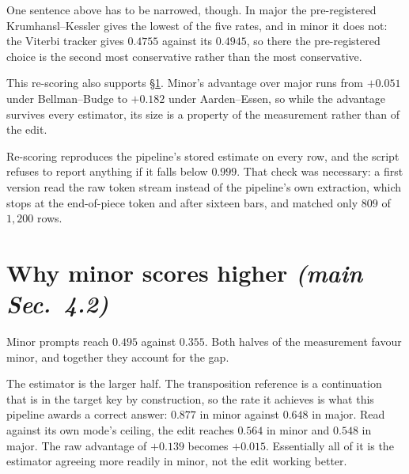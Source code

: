 \documentclass{article}
\begin{document}
One sentence above has to be narrowed, though. In major the pre-registered
Krumhansl--Kessler gives the lowest of the five rates, and in minor it does not: the
Viterbi tracker gives $0.4755$ against its $0.4945$, so there the pre-registered choice
is the second most conservative rather than the most conservative.

This re-scoring also supports \S\ref{sec:minor}. Minor's advantage over major runs from
$+0.051$ under Bellman--Budge to $+0.182$ under Aarden--Essen, so while the advantage
survives every estimator, its size is a property of the measurement rather than of the
edit.

Re-scoring reproduces the pipeline's stored estimate on every row, and the script
refuses to report anything if it falls below $0.999$. That check was necessary: a
first version read the raw token stream instead of the pipeline's own extraction, which
stops at the end-of-piece token and after sixteen bars, and matched only $809$ of
$1{,}200$ rows.

\section{Why minor scores higher \normalfont\textit{(main Sec.~4.2)}}
\label{sec:minor}
%

Minor prompts reach $0.495$ against $0.355$. Both halves of the measurement favour
minor, and together they account for the gap.

The estimator is the larger half. The transposition reference is a continuation that is
in the target key by construction, so the rate it achieves is what this pipeline awards
a correct answer: $0.877$ in minor against $0.648$ in major. Read against its own mode's
ceiling, the edit reaches $0.564$ in minor and $0.548$ in major. The raw advantage of
$+0.139$ becomes $+0.015$. Essentially all of it is the estimator agreeing more readily
in minor, not the edit working better.
\end{document}
